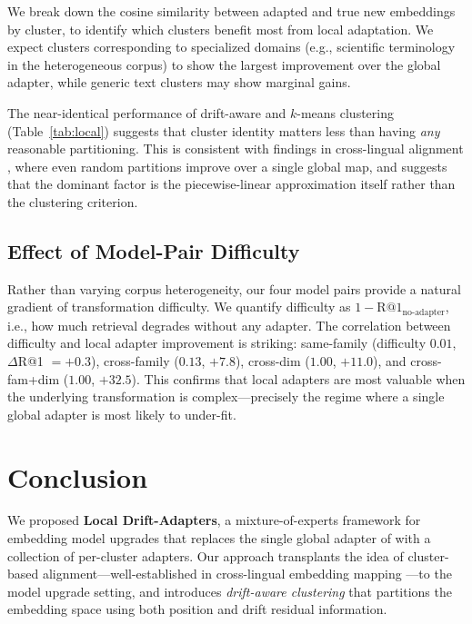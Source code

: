 \documentclass[11pt,a4paper]{article}
\begin{document}
We break down the cosine similarity between adapted and true new embeddings by cluster, to identify which clusters benefit most from local adaptation.
We expect clusters corresponding to specialized domains (e.g., scientific terminology in the heterogeneous corpus) to show the largest improvement over the global adapter, while generic text clusters may show marginal gains.

The near-identical performance of drift-aware and $k$-means clustering (Table~\ref{tab:local}) suggests that cluster identity matters less than having \emph{any} reasonable partitioning.
This is consistent with findings in cross-lingual alignment \citep{dan2020cluster}, where even random partitions improve over a single global map, and suggests that the dominant factor is the piecewise-linear approximation itself rather than the clustering criterion.

\subsection{Effect of Model-Pair Difficulty}
\label{sec:analysis:difficulty}

Rather than varying corpus heterogeneity, our four model pairs provide a natural gradient of transformation difficulty.
We quantify difficulty as $1 - \text{R@1}_{\text{no-adapter}}$, i.e., how much retrieval degrades without any adapter.
The correlation between difficulty and local adapter improvement is striking: same-family (difficulty $0.01$, $\Delta$R@1 $= +0.3$), cross-family ($0.13$, $+7.8$), cross-dim ($1.00$, $+11.0$), and cross-fam+dim ($1.00$, $+32.5$).
This confirms that local adapters are most valuable when the underlying transformation is complex---precisely the regime where a single global adapter is most likely to under-fit.

\section{Conclusion}
\label{sec:conclusion}

We proposed \textbf{Local Drift-Adapters}, a mixture-of-experts framework for embedding model upgrades that replaces the single global adapter of \citet{vejendla2025drift} with a collection of per-cluster adapters.
Our approach transplants the idea of cluster-based alignment---well-established in cross-lingual embedding mapping \citep{dan2020cluster,nakashole2018mapping}---to the model upgrade setting, and introduces \emph{drift-aware clustering} that partitions the embedding space using both position and drift residual information.
\end{document}
